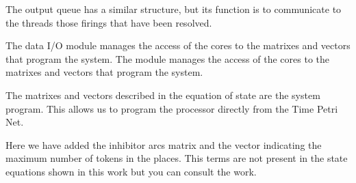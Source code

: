     The output queue has a similar structure, but its function is to communicate to the threads those 
	firings that have been resolved.
	
	The data I/O module manages the access of the cores to the matrixes and vectors that program the 
	system. The module manages the access of the cores to the matrixes and vectors that program the system. 
	
	The matrixes and vectors described in the equation of state are the system program. This allows 
	us to program the processor directly from the Time Petri Net.
	
    Here we have added the inhibitor arcs matrix and the vector indicating the maximum number of tokens 
    in the places. This terms are not present in the state equations shown in this work but you can 
    consult the work\cite{paperProcesador}.\\
    
